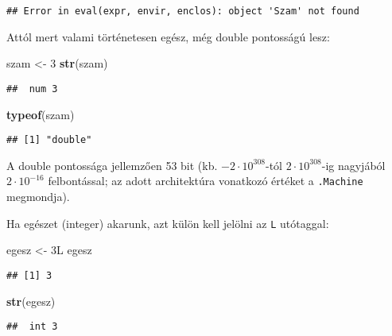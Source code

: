 \documentclass[]{book}
\newenvironment{Shaded}{\begin{snugshade}}{\end{snugshade}}
\newcommand{\DecValTok}[1]{\textcolor[rgb]{0.00,0.00,0.81}{#1}}
\newcommand{\KeywordTok}[1]{\textcolor[rgb]{0.13,0.29,0.53}{\textbf{#1}}}
\newcommand{\NormalTok}[1]{#1}
\newcommand{\StringTok}[1]{\textcolor[rgb]{0.31,0.60,0.02}{#1}}
\begin{document}
\begin{verbatim}
## Error in eval(expr, envir, enclos): object 'Szam' not found
\end{verbatim}

Attól mert valami történetesen egész, még double pontosságú lesz:

\begin{Shaded}
\begin{Highlighting}[]
\NormalTok{szam <-}\StringTok{ }\DecValTok{3}
\KeywordTok{str}\NormalTok{(szam)}
\end{Highlighting}
\end{Shaded}

\begin{verbatim}
##  num 3
\end{verbatim}

\begin{Shaded}
\begin{Highlighting}[]
\KeywordTok{typeof}\NormalTok{(szam)}
\end{Highlighting}
\end{Shaded}

\begin{verbatim}
## [1] "double"
\end{verbatim}

A double pontossága jellemzően 53 bit (kb. \(-2\cdot 10^{308}\)-tól \(2\cdot 10^{308}\)-ig nagyjából \(2\cdot 10^{-16}\) felbontással; az adott architektúra vonatkozó értéket a \texttt{.Machine} megmondja).

Ha egészet (integer) akarunk, azt külön kell jelölni az \texttt{L} utótaggal:

\begin{Shaded}
\begin{Highlighting}[]
\NormalTok{egesz <-}\StringTok{ }\NormalTok{3L}
\NormalTok{egesz}
\end{Highlighting}
\end{Shaded}

\begin{verbatim}
## [1] 3
\end{verbatim}

\begin{Shaded}
\begin{Highlighting}[]
\KeywordTok{str}\NormalTok{(egesz)}
\end{Highlighting}
\end{Shaded}

\begin{verbatim}
##  int 3
\end{verbatim}
\end{document}
